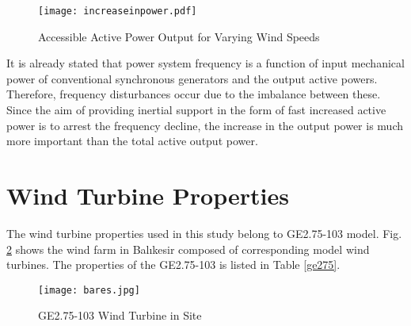 \begin{figure}[h!]
	\centering
	\texttt{[image: increaseinpower.pdf]}
	\caption{Accessible Active Power Output for Varying Wind Speeds}
	\label{increase_active_power}
\end{figure}
It is already stated that power system frequency is a function of input mechanical power of conventional synchronous generators and the output active powers. Therefore, frequency disturbances occur due to the imbalance between these. Since the aim of providing inertial support in the form of fast increased active power is to arrest the frequency decline, the increase in the output power is much more important than the total active output power. 
\section{Wind Turbine Properties}
The wind turbine properties used in this study belong to GE2.75-103 model. Fig. \ref{bares} shows the wind farm in Balıkesir composed of corresponding model wind turbines. The properties of the GE2.75-103 is listed in Table \ref{ge275}.
\begin{figure}[h!]
	\centering
	\texttt{[image: bares.jpg]}
	\caption{GE2.75-103 Wind Turbine in Site}
	\label{bares}
\end{figure}

